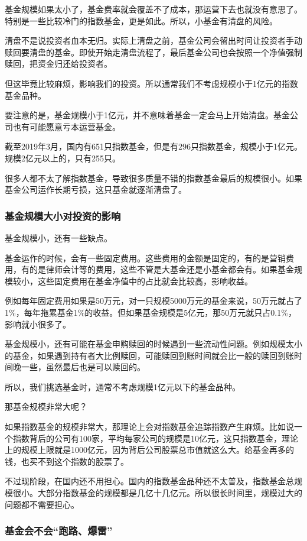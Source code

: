 基金规模如果太小了，基金费率就会覆盖不了成本，那运营下去也就没有意思了。特别是一些比较冷门的指数基金，更是如此。所以，小基金有清盘的风险。

清盘不是说投资者血本无归。实际上清盘之前，基金公司会留出时间让投资者手动赎回要清盘的基金。即使开始走清盘流程了，最后基金公司也会按照一个净值强制赎回，把资金归还给投资者。

但这毕竟比较麻烦，影响我们的投资。所以通常我们不考虑规模小于1亿元的指数基金品种。

要注意的是，基金规模小于1亿元，并不意味着基金一定会马上开始清盘。基金公司也有可能愿意亏本运营基金。

截至2019年3月，国内有651只指数基金，但是有296只指数基金，规模小于1亿元。规模2亿元以上的，只有255只。

很多人都不太了解指数基金，导致很多质量不错的指数基金最后的规模很小。如果基金公司运作长期亏损，这只基金就逐渐清盘了。

\subsubsection{基金规模大小对投资的影响}

基金规模小，还有一些缺点。

基金运作的时候，会有一些固定费用。这些费用的金额是固定的，有的是营销费用，有的是律师会计等的费用，这些不管是大基金还是小基金都会有。如果基金规模较小，这些固定费用在基金净值中的占比就会比较高，影响收益。

例如每年固定费用如果是50万元，对一只规模5000万元的基金来说，50万元就占了1\%，每年拖累基金1\%的收益。但如果基金规模是5亿元，那50万元就只占0.1\%，影响就小很多了。

基金规模小，还有可能在基金申购赎回的时候遇到一些流动性问题。例如规模太小的基金，如果遇到持有者大比例赎回，可能赎回到账时间就会比一般的赎回到账时间晚一些，虽然最后也是可以赎回的。

所以，我们挑选基金时，通常不考虑规模1亿元以下的基金品种。

那基金规模非常大呢？

如果指数基金的规模非常大，那理论上会对指数基金追踪指数产生麻烦。比如说一个指数背后的公司有100家，平均每家公司的规模是10亿元，这只指数基金，理论上的规模上限就是1000亿元，因为背后公司股票总市值就这么大。给基金再多的钱，也买不到这个指数的股票了。

不过现阶段，在国内还不用担心。国内的指数基金品种还不太普及，指数基金总规模很小。大部分指数基金的规模都是几亿十几亿元。所以很长时间里，规模过大的问题都不需要担心。

\subsubsection{基金会不会“跑路、爆雷”}

